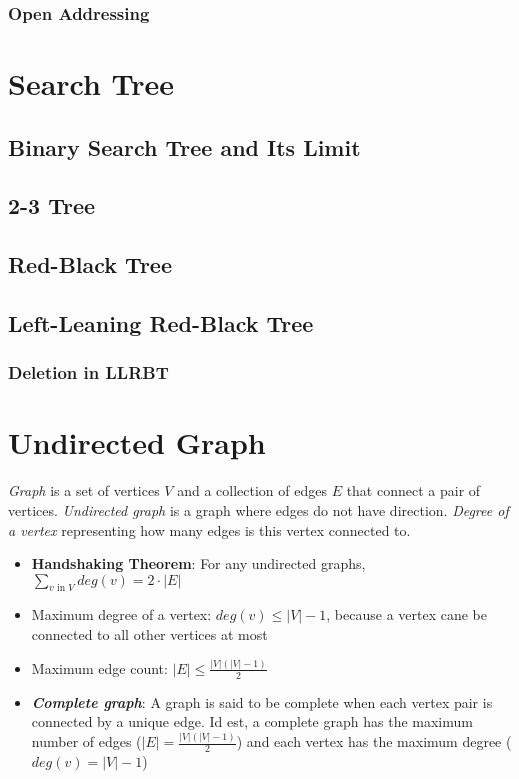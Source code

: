 \documentclass{report}
\begin{document}
\subsection{Open Addressing}


\chapter{Search Tree}

\section{Binary Search Tree and Its Limit}

\section{2-3 Tree}

\section{Red-Black Tree}

\section{Left-Leaning Red-Black Tree}

\subsection{Deletion in LLRBT}


\chapter{Undirected Graph}

\textit{Graph} is a set of vertices $V$ and a collection of edges $E$ that connect a pair of vertices. \textit{Undirected graph} is a graph where edges do not have direction. \textit{Degree of a vertex} representing how many edges is this vertex connected to.

\begin{itemize}
  \item \textbf{Handshaking Theorem}: For any undirected graphs, \(\sum_{v \text{ in } V} deg(v) = 2 \cdot |E|\)
  \item Maximum degree of a vertex: $deg(v) \leq |V| - 1$, because a vertex cane be connected to all other vertices at most
  \item Maximum edge count: $|E| \leq \frac{|V|(|V| - 1)}{2}$
  \item \textbf{\textit{Complete graph}}: A graph is said to be complete when each vertex pair is connected by a unique edge. Id est, a complete graph has the maximum number of edges ($|E| = \frac{|V|(|V| - 1)}{2}$) and each vertex has the maximum degree ($deg(v) = |V| - 1$)
\end{itemize}
\end{document}

